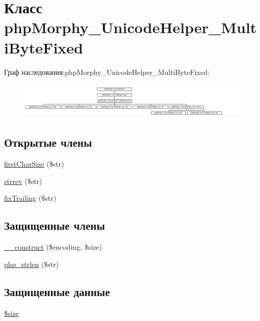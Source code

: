 \hypertarget{classphpMorphy__UnicodeHelper__MultiByteFixed}{
\section{Класс phpMorphy\_\-UnicodeHelper\_\-MultiByteFixed}
\label{classphpMorphy__UnicodeHelper__MultiByteFixed}
}
Граф наследования:phpMorphy\_\-UnicodeHelper\_\-MultiByteFixed:\begin{figure}[H]
\begin{center}
\leavevmode
\includegraphics[height=1.754386cm]{classphpMorphy__UnicodeHelper__MultiByteFixed}
\end{center}
\end{figure}
\subsection*{Открытые члены}
\begin{DoxyCompactItemize}
\item 
\hyperlink{classphpMorphy__UnicodeHelper__MultiByteFixed_a8ab5d36a37071cb426f315100596a237}{firstCharSize} (\$str)
\item 
\hyperlink{classphpMorphy__UnicodeHelper__MultiByteFixed_a3b126f472ad5111f12be0f809d6edd76}{strrev} (\$str)
\item 
\hyperlink{classphpMorphy__UnicodeHelper__MultiByteFixed_a5592c7e7efb44f379e6cfeb591a66a0f}{fixTrailing} (\$str)
\end{DoxyCompactItemize}
\subsection*{Защищенные члены}
\begin{DoxyCompactItemize}
\item 
\hyperlink{classphpMorphy__UnicodeHelper__MultiByteFixed_a6fa8255bf07349f1475239a422474bf2}{\_\-\_\-construct} (\$encoding, \$size)
\item 
\hyperlink{classphpMorphy__UnicodeHelper__MultiByteFixed_ab98d64f2d94d6df73ef132530cf7833e}{php\_\-strlen} (\$str)
\end{DoxyCompactItemize}
\subsection*{Защищенные данные}
\begin{DoxyCompactItemize}
\item 
\hyperlink{classphpMorphy__UnicodeHelper__MultiByteFixed_af3daa563809e7eb385bdacc7503521b8}{\$size}
\end{DoxyCompactItemize}


